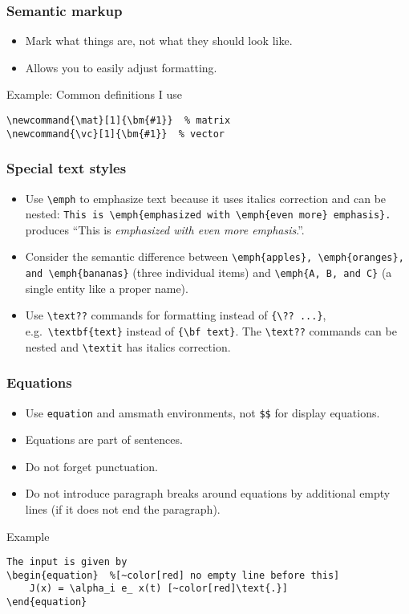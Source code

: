 \documentclass[aspectratio=1610]{beamer}
\begin{document}
\begin{frame}[fragile]
    \frametitle{Semantic markup}
    \begin{itemize}
        \item Mark what things are, not what they should look like.
        \item Allows you to easily adjust formatting.
    \end{itemize}
    \begin{beamerboxesrounded}{Example: Common definitions I use}
        \begin{verbatim}
\newcommand{\mat}[1]{\bm{#1}}  % matrix
\newcommand{\vc}[1]{\bm{#1}}  % vector
        \end{verbatim}
    \end{beamerboxesrounded}
\end{frame}

\begin{frame}[fragile]
    \frametitle{Special text styles}
    \begin{itemize}
        \item Use \verb+\emph+ to emphasize text because it uses italics correction and can be nested: \verb+This is \emph{emphasized with \emph{even more} emphasis}.+ produces ``This is \emph{emphasized with \emph{even more} emphasis}.''.
        \item Consider the semantic difference between \verb+\emph{apples}, \emph{oranges}, and \emph{bananas}+ (three individual items) and \verb+\emph{A, B, and C}+ (a single entity like a proper name).
        \item Use \verb+\text??+ commands for formatting instead of \verb+{\?? ...}+, e.g.~\verb+\textbf{text}+ instead of \verb+{\bf text}+. The \verb+\text??+ commands can be nested and \verb+\textit+ has italics correction.
    \end{itemize}
\end{frame}

\begin{frame}[fragile]
    \frametitle{Equations}
    \begin{itemize}
        \item Use \verb+equation+ and amsmath environments, not \verb+$$+ for display equations.
        \item Equations are part of sentences.
        \item Do not forget punctuation.
        \item Do not introduce paragraph breaks around equations by additional empty lines (if it does not end the paragraph).
    \end{itemize}
    \begin{beamerboxesrounded}{Example}
        \begin{Verbatim}[commandchars=~\[\]]
The input is given by
\begin{equation}  %[~color[red] no empty line before this]
    J(x) = \alpha_i e_ x(t) [~color[red]\text{.}]
\end{equation}
        \end{Verbatim}
    \end{beamerboxesrounded}
\end{frame}
\end{document}
